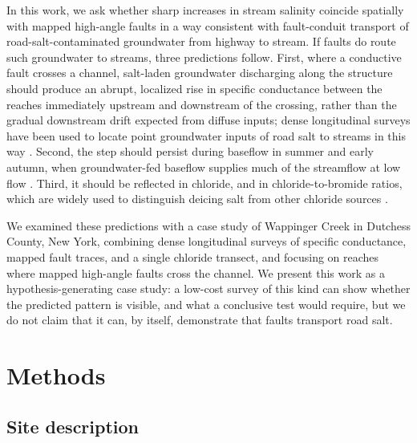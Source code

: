 \documentclass{article}
\begin{document}
In this work, we ask whether sharp increases in stream salinity coincide spatially with mapped high-angle faults in a way consistent with fault-conduit transport of road-salt-contaminated groundwater from highway to stream. If faults do route such groundwater to streams, three predictions follow. First, where a conductive fault crosses a channel, salt-laden groundwater discharging along the structure should produce an abrupt, localized rise in specific conductance between the reaches immediately upstream and downstream of the crossing, rather than the gradual downstream drift expected from diffuse inputs; dense longitudinal surveys have been used to locate point groundwater inputs of road salt to streams in this way \citep{harte2010,hodgins2024,hodgins2026}. Second, the step should persist during baseflow in summer and early autumn, when groundwater-fed baseflow supplies much of the streamflow at low flow \citep{miller2014}. Third, it should be reflected in chloride, and in chloride-to-bromide ratios, which are widely used to distinguish deicing salt from other chloride sources \citep{mullaney2009}.

We examined these predictions with a case study of Wappinger Creek in Dutchess County, New York, combining dense longitudinal surveys of specific conductance, mapped fault traces, and a single chloride transect, and focusing on reaches where mapped high-angle faults cross the channel. We present this work as a hypothesis-generating case study: a low-cost survey of this kind can show whether the predicted pattern is visible, and what a conclusive test would require, but we do not claim that it can, by itself, demonstrate that faults transport road salt.

\section{Methods}

\subsection{Site description}\label{sec:site}
\end{document}
